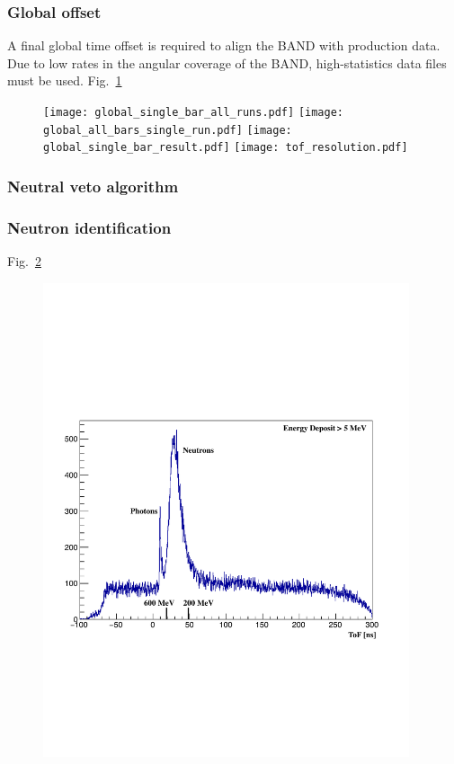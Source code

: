 \documentclass[review]{elsarticle}
\begin{document}
\subsubsection{Global offset}
A final global time offset is required to align the BAND with production data. Due to low rates in the angular coverage of the BAND, 
high-statistics data files must be used. 
Fig.~\ref{fig:final_offset}
\begin{figure}[h!]
	\centering
		\texttt{[image: global\_single\_bar\_all\_runs.pdf]}
		\texttt{[image: global\_all\_bars\_single\_run.pdf]}
		\texttt{[image: global\_single\_bar\_result.pdf]}
		\texttt{[image: tof\_resolution.pdf]}
	\caption{}
	\label{fig:final_offset}
\end{figure}
\subsubsection{Neutral veto algorithm}

\subsubsection{Neutron identification}
Fig.~\ref{fig:tof}
\begin{figure}[h!]
	\centering
		\includegraphics[width=0.96\textwidth]{tof-labels.pdf}
	\caption{}
	\label{fig:tof}
\end{figure}
\end{document}
